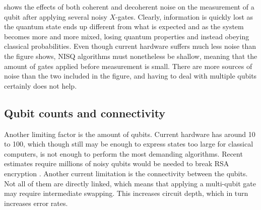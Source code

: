  shows the effects of both coherent and decoherent noise on the measurement of a qubit after applying several noisy $X$-gates.
Clearly, information is quickly lost as the quantum state ends up different from what is expected and as the system becomes more and more mixed, losing quantum properties and instead obeying classical probabilities.
Even though current hardware suffers much less noise than the figure shows, NISQ algorithms must nonetheless be shallow, meaning that the amount of gates applied before measurement is small.
There are more sources of noise than the two included in the figure, and having to deal with multiple qubits certainly does not help.

\subsection{Qubit counts and connectivity}
Another limiting factor is the amount of qubits.
Current hardware has around 10 to 100, which though still may be enough to express states too large for classical computers, is not enough to perform the most demanding algorithms.
Recent estimates require millions of noisy qubits would be needed to break RSA encryption \cite{gidney2021}.
Another current limitation is the connectivity between the qubits.
Not all of them are directly linked, which means that applying a multi-qubit gate may require intermediate swapping.
This increases circuit depth, which in turn increases error rates.
